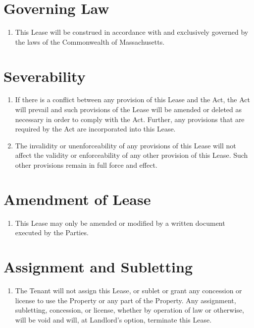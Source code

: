 \documentclass[12pt]{article}
\begin{document}
\section*{Governing Law}
\begin{enumerate}[resume]
    \item This Lease will be construed in accordance with and exclusively
	    governed by the laws of the Commonwealth of Massachusetts.
\end{enumerate}
    
\section*{Severability}
\begin{enumerate}[resume]
    \item If there is a conflict between any provision of this Lease and the
	    Act, the Act will prevail and such provisions of the Lease will be
		amended or deleted as necessary in order to comply with the
		Act. Further, any provisions that are required by the Act are
		incorporated into this Lease.
    \item The invalidity or unenforceability of any provisions of this Lease
	    will not affect the validity or enforceability of any other
		provision of this Lease.  Such other provisions remain in full
		force and effect.
\end{enumerate}
    
\section*{Amendment of Lease}
\begin{enumerate}[resume]
   \item  This Lease may only be amended or modified by a written document
	   executed by the Parties.
\end{enumerate}    
    
\section*{Assignment and Subletting}
\begin{enumerate}[resume]
    \item The Tenant will not assign this Lease, or sublet or grant any
	    concession or license to use the Property or any part of the
		Property. Any assignment, subletting, concession, or license,
		whether by operation of law or otherwise, will be void and
		will, at Landlord's option, terminate this Lease.
\end{enumerate}
    
\end{document}

